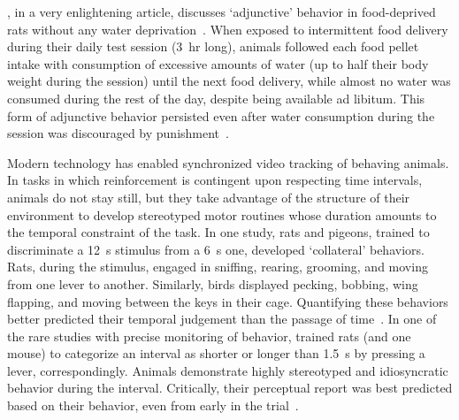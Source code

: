 , in a very enlightening article, discusses `adjunctive' behavior in food-deprived rats without any water deprivation~\cite{Falk1971}.
When exposed to intermittent food delivery during their daily test session (3~hr long), animals followed each food pellet intake with consumption of excessive amounts of water (up to half their body weight during the session) until the next food delivery, while almost no water was consumed during the rest of the day, despite being available ad libitum.
This form of adjunctive behavior persisted even after water consumption during the session was discouraged by punishment~\cite{Falk1971}.\footnotemark
{}
\par
Modern technology has enabled synchronized video tracking of behaving animals.
In tasks in which reinforcement is contingent upon respecting time intervals, animals do not stay still, but they take advantage of the structure of their environment to develop stereotyped motor routines whose duration amounts to the temporal constraint of the task.
In one study, rats and pigeons, trained to discriminate a 12~s stimulus from a 6~s one, developed `collateral' behaviors.
Rats, during the stimulus, engaged in sniffing, rearing, grooming, and moving from one lever to another.
Similarly, birds displayed pecking, bobbing\footnotemark, wing flapping, and moving between the keys in their cage.
Quantifying these behaviors better predicted their temporal judgement than the passage of time~\cite{Fetterman1998BehProc}.
In one of the rare studies with precise monitoring of behavior, \citeauthor{Gouvea2014} trained rats (and one mouse) to categorize an interval as shorter or longer than 1.5~s by pressing a lever, correspondingly.
Animals demonstrate highly stereotyped and idiosyncratic behavior during the interval.
Critically, their perceptual report was best predicted based on their behavior, even from early in the trial~\cite{Gouvea2014}.
